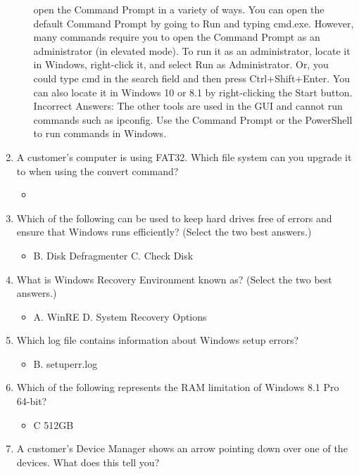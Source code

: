 \documentclass{article}
\begin{document}
\begin{enumerate}
\begin{itemize}
open the Command Prompt in a variety of ways. You can open the default Command
Prompt by going to Run and typing cmd.exe. However, many commands require you
to open the Command Prompt as an administrator (in elevated mode). To run it as an
administrator, locate it in Windows, right-click it, and select Run as Administrator. Or,
you could type cmd in the search field and then press Ctrl+Shift+Enter. You can also
locate it in Windows 10 or 8.1 by right-clicking the Start button.
Incorrect Answers: The other tools are used in the GUI and cannot run commands
such as ipconfig. Use the Command Prompt or the PowerShell to run commands in
Windows.
     \end{itemize}
     \item A customer’s computer is using FAT32. Which file system can you
upgrade it to when using the convert command?
     \begin{itemize}
         \item 
     \end{itemize}
     \item Which of the following can be used to keep hard drives free of
errors and ensure that Windows runs efficiently? (Select the two
best answers.)
     \begin{itemize}
         \item B. Disk Defragmenter C. Check Disk
     \end{itemize}
     \item What is Windows Recovery Environment known as? (Select the
two best answers.)
     \begin{itemize}
         \item A. WinRE D. System Recovery Options
     \end{itemize}
     \item Which log file contains information about Windows setup errors?
     \begin{itemize}
         \item B. setuperr.log
     \end{itemize}
     \item Which of the following represents the RAM limitation of Windows
8.1 Pro 64-bit?
     \begin{itemize}
         \item C 512GB
     \end{itemize}
     \item A customer’s Device Manager shows an arrow pointing down over
one of the devices. What does this tell you?
     \begin{itemize}

\end{itemize}
\end{enumerate}
\end{document}
